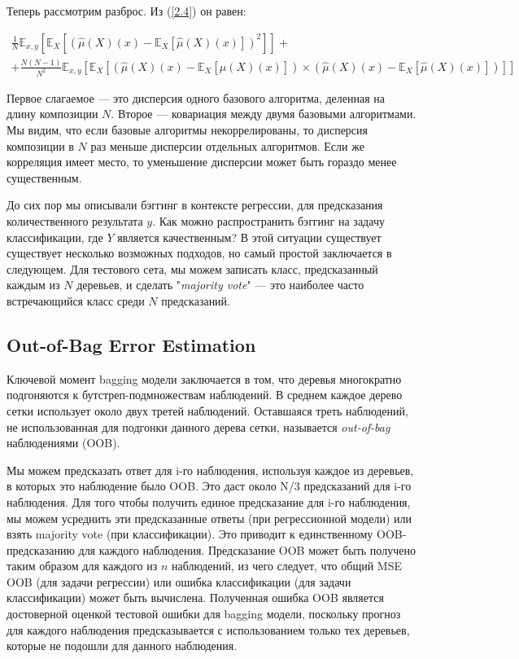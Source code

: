 \documentclass{article}
\begin{document}
Теперь рассмотрим разброс. Из (\ref{2.4}) он равен:

\begin{multline}
	\frac{1}{N}\mathbb{E}_{x,y}\left[\mathbb{E}_X\left[\left(\hat{\mu}(X)(x)-\mathbb{E}_X[\hat{\mu}(X)(x)]\right)^2\right]\right] + \\ + 
	\frac{N(N-1)}{N^2}\mathbb{E}_{x,y}\left[\mathbb{E}_X\left[\left(\hat{\mu}(X)(x)-\mathbb{E}_X[\hat{\mu}(X)(x)]\right)\times \left(\hat{\mu}(X)(x)-\mathbb{E}_X[\hat{\mu}(X)(x)]\right)\right]\right]
\end{multline}

Первое слагаемое — это дисперсия одного базового алгоритма, деленная на длину композиции $N.$ Второе --- ковариация между двумя базовыми алгоритмами. Мы видим, что если базовые алгоритмы некоррелированы, то дисперсия композиции в $N$ раз меньше дисперсии отдельных алгоритмов. Если же корреляция имеет место, то уменьшение дисперсии может быть гораздо менее существенным.

До сих пор мы описывали бэггинг в контексте регрессии, для предсказания количественного результата $y$. Как можно распространить бэггинг на задачу классификации, где $Y$ является качественным? В этой ситуации существует существует несколько возможных подходов, но самый простой заключается в следующем. Для тестового сета, мы можем записать класс, предсказанный каждым из $N$ деревьев, и сделать "\textit{majority vote}" --- это наиболее часто встречающийся класс среди $N$ предсказаний.

\subsection{Out-of-Bag Error Estimation}

Ключевой момент bagging модели заключается в том, что деревья многократно подгоняются к бутстреп-подмножествам наблюдений. В среднем каждое дерево сетки использует около двух третей наблюдений. Оставшаяся треть наблюдений, не использованная для подгонки данного дерева сетки, называется \textit{out-of-bag} наблюдениями (OOB).

Мы можем предсказать ответ для i-го наблюдения, используя каждое из деревьев, в которых это наблюдение было OOB. Это даст около N/3 предсказаний для i-го наблюдения. Для того чтобы получить единое предсказание для i-го  наблюдения, мы можем усреднить эти предсказанные ответы (при регрессионной модели) или взять majority vote (при классификации). Это приводит к единственному OOB-предсказанию для каждого наблюдения. Предсказание OOB может быть получено таким образом для каждого из $n$ наблюдений, из чего следует, что общий MSE OOB (для задачи регрессии) или ошибка классификации (для задачи классификации) может быть вычислена. Полученная ошибка OOB является достоверной оценкой тестовой ошибки для bagging модели, поскольку прогноз для каждого наблюдения предсказывается с использованием только тех деревьев, которые не подошли для данного наблюдения. 
\end{document}
